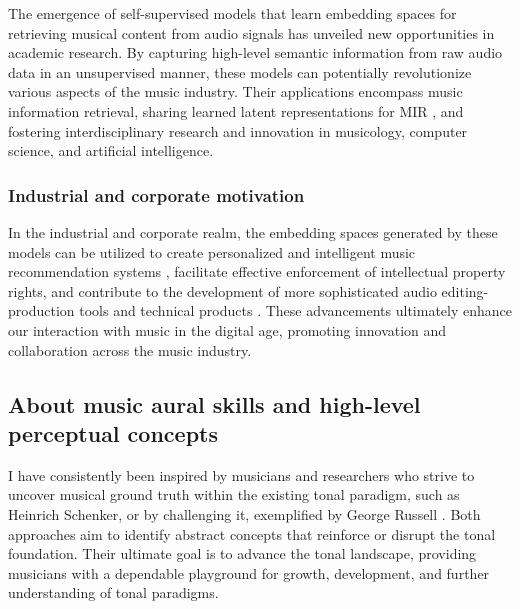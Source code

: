 The emergence of self-supervised models that learn embedding spaces for retrieving musical content from audio signals has unveiled new opportunities in academic research. By capturing high-level semantic information from raw audio data in an unsupervised manner, these models can potentially revolutionize various aspects of the music industry. Their applications encompass music information retrieval, sharing learned latent representations for MIR \cite{HamelTransferSimilarity}, and fostering interdisciplinary research and innovation in musicology, computer science, and artificial intelligence.

\subsubsection{Industrial and corporate motivation}

In the industrial and corporate realm, the embedding spaces generated by these models can be utilized to create personalized and intelligent music recommendation systems \cite{Chen2020LearningRecommendation}\cite{epidemic}, facilitate effective enforcement of intellectual property rights, and contribute to the development of more sophisticated audio editing-production tools and technical products \cite{WonEmotionStories}. These advancements ultimately enhance our interaction with music in the digital age, promoting innovation and collaboration across the music industry.

\subsection{About music aural skills and high-level perceptual concepts}

I have consistently been inspired by musicians and researchers who strive to uncover musical ground truth within the existing tonal paradigm, such as Heinrich Schenker, or by challenging it, exemplified by George Russell \cite{LydianRussell}. Both approaches aim to identify abstract concepts that reinforce or disrupt the tonal foundation. Their ultimate goal is to advance the tonal landscape, providing musicians with a dependable playground for growth, development, and further understanding of tonal paradigms.


